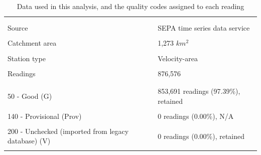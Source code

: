 \documentclass[
  11pt,
  a4paper]{article}
\begin{document}
\begin{table}[!h]

\caption{\label{tab:tidyingthedata}Data used in this analysis, and the quality codes assigned to each reading}
\fontsize{9}{11}\selectfont
\begin{tabular}[t]{ll}
\toprule
 & \\
\midrule
\addlinespace[0.3em]
\multicolumn{2}{l}{\textbf{Data description}}\\
\hspace{1em}\cellcolor{gray!10}{Station} & \cellcolor{gray!10}{Don at Parkhill}\\
\hspace{1em}Source & SEPA time series data service\\
\hspace{1em}\cellcolor{gray!10}{Measurement} & \cellcolor{gray!10}{River discharge ($m^3/s$)}\\
\hspace{1em}Catchment area & 1,273 $km^2$\\
\hspace{1em}\cellcolor{gray!10}{Resolution} & \cellcolor{gray!10}{15 minutes}\\
\hspace{1em}Station type & Velocity-area\\
\hspace{1em}\cellcolor{gray!10}{Period} & \cellcolor{gray!10}{01 October 2001 - 30 September 2026}\\
\hspace{1em}Readings & 876,576\\
\hspace{1em}\cellcolor{gray!10}{Missing readings} & \cellcolor{gray!10}{0}\\
\addlinespace[0.3em]
\multicolumn{2}{l}{\textbf{Quality codes}}\\
\hspace{1em}50 - Good (G) & 853,691 readings (97.39\%), retained\\
\hspace{1em}\cellcolor{gray!10}{100 - Estimated (E)} & \cellcolor{gray!10}{21,962 readings (2.51\%), retained}\\
\hspace{1em}140 - Provisional (Prov) & 0 readings (0.00\%), N/A\\
\hspace{1em}\cellcolor{gray!10}{150 - Suspect (S)} & \cellcolor{gray!10}{852 readings (0.10\%), excluded}\\
\hspace{1em}200 - Unchecked (imported from legacy database) (V) & 0 readings (0.00\%), retained\\
\hspace{1em}\cellcolor{gray!10}{254 - Unchecked (U)} & \cellcolor{gray!10}{71 readings (0.01\%), retained}\\
\bottomrule
\end{tabular}
\end{table}
\end{document}
